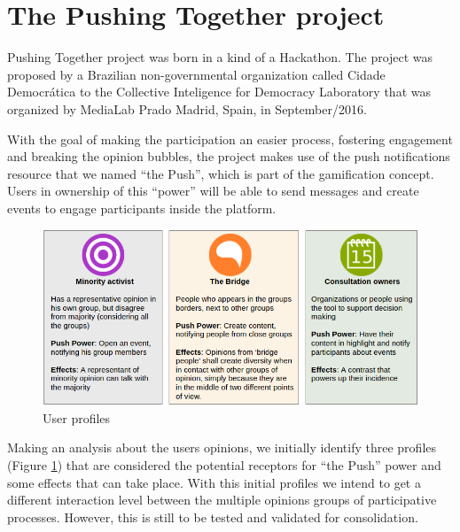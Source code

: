 \documentclass{llncs}
\begin{document}
\section{The Pushing Together project}
\label{sec:pushingtogether}

  Pushing Together project was born in a kind of a Hackathon. The project was
proposed by a Brazilian non-governmental organization called Cidade Democrática
to the Collective Inteligence for Democracy Laboratory that was organized by
MediaLab Prado Madrid, Spain, in September/2016.

  With the goal of making the participation an easier process, fostering
engagement and breaking the opinion bubbles, the project makes use of the
push notifications resource that we named ``the Push'', which is part of the
gamification concept. Users in ownership of this ``power'' will be able to send
messages and create events to engage participants inside the platform.

 \begin{figure}[hbt]
   \centering
     \includegraphics[keepaspectratio=true,scale=0.45]{images/userprofiles.png}
   \caption{User profiles}
   \label{fig:userprofiles}
 \end{figure}

  Making an analysis about the users opinions, we initially identify three
profiles (Figure \ref{fig:userprofiles}) that are considered the potential
receptors for ``the Push'' power and some effects that can take place. With this
initial profiles we intend to get a different interaction level between
the multiple opinions groups of participative processes. However, this is still
to be tested and validated for consolidation.
\end{document}
